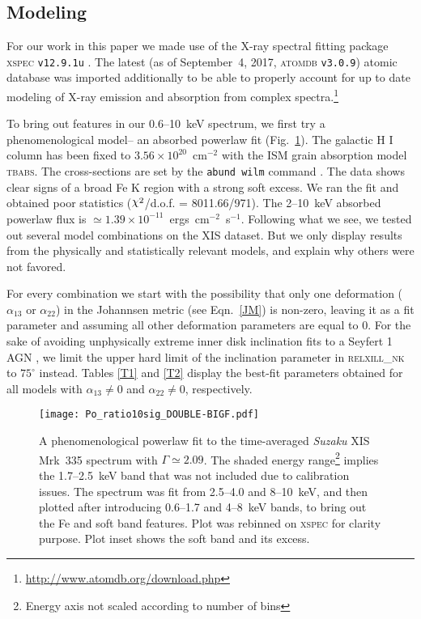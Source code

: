 \documentclass[aps,prd,twocolumn,superscriptaddress,nofootinbib,amsmath,amssymb]{revtex4-1}
\DeclareRobustCommand{\rchi}{{\mathpalette\irchi\relax}}
\newcommand{\irchi}[2]{\raisebox{\depth}{$#1\chi$}} %
\begin{document}
\subsection{\label{mod}M\lowercase{odeling}}

For our work in this paper we made use of the X-ray spectral fitting package \textsc{xspec} \texttt{v12.9.1u} \citep{XSPEC}. The latest (as of September~4, 2017, \textsc{atomdb} \texttt{v3.0.9}) atomic database was imported additionally to be able to properly account for up to date modeling of X-ray emission and absorption from complex spectra.\footnote{\url{http://www.atomdb.org/download.php}}

To bring out features in our 0.6--10~keV spectrum, we first try a phenomenological model-- an absorbed powerlaw fit (Fig.~\ref{phenom}). The galactic H I column has been fixed to $3.56 \times 10^{20}$~cm$^{-2}$ \citep{Kalberla2005} with the ISM grain absorption model \textsc{tbabs}. The cross-sections are set by the \texttt{abund wilm} command \citep{Wilms2000}. The data shows clear signs of a broad Fe K region with a strong soft excess. We ran the fit and obtained poor statistics ($\rchi^2$/d.o.f. = 8011.66/971). The 2--10~keV absorbed powerlaw flux is $\simeq 1.39 \times 10^{-11}$~ergs~cm$^{-2}$~s$^{-1}$. Following what we see, we tested out several model combinations on the XIS dataset. But we only display results from the physically and statistically relevant models, and explain why others were not favored. 

For every combination we start with the possibility that only one deformation ($\alpha_{13}$ or $\alpha_{22}$) in the Johannsen metric (see Eqn.~\ref{JM}) is non-zero, leaving it as a fit parameter and assuming all other deformation parameters are equal to 0. For the sake of avoiding unphysically extreme inner disk inclination fits to a Seyfert 1 AGN \citep[e.g., ][]{Nandra1997,Rakshit2017}, we limit the upper hard limit of the inclination parameter in \textsc{relxill\_nk} to $75^\circ$ instead. Tables \ref{T1} and \ref{T2} display the best-fit parameters obtained for all models with $\alpha_{13} \neq 0$ and $\alpha_{22} \neq 0$, respectively. 




\begin{figure}[!t] 
\centering
\texttt{[image: Po\_ratio10sig\_DOUBLE-BIGF.pdf]}
\caption{A phenomenological powerlaw fit to the time-averaged \textit{Suzaku} XIS Mrk~335 spectrum with $\Gamma\simeq2.09$. The shaded energy range\footnote{Energy axis not scaled according to number of bins} implies the 1.7--2.5~keV band that was not included due to calibration issues. The spectrum was fit from 2.5--4.0 and 8--10~keV, and then plotted after introducing 0.6--1.7 and 4--8~keV bands, to bring out the Fe and soft band features. Plot was rebinned on \textsc{xspec} for clarity purpose. Plot inset shows the soft band and its excess.}\label{phenom}
\end{figure}
\end{document}
